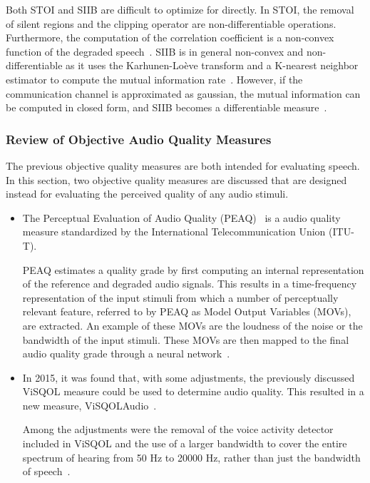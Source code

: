 Both STOI and SIIB are difficult to optimize for directly. 
In STOI, the removal of silent regions and the clipping operator are non-differentiable operations.
Furthermore, the computation of the correlation coefficient is a non-convex function of the degraded speech~\cite{taal2011algorithm}.
SIIB is in general non-convex and non-differentiable as it uses the Karhunen-Lo\`eve transform and a 
K-nearest neighbor estimator to compute the mutual information rate~\cite{van2017instrumental}.
However, if the communication channel is approximated as gaussian, the mutual information can be computed in closed form,
and SIIB becomes a differentiable measure~\cite{van2017instrumental}.

\subsubsection{Review of Objective Audio Quality Measures}
The previous objective quality measures are both intended for evaluating speech.
In this section, two objective quality measures are discussed that are designed instead 
for evaluating the perceived quality of any audio stimuli.
\begin{itemize}
    \item 
    The Perceptual Evaluation of Audio Quality (PEAQ)~\cite{thiede2000peaq}
    is a audio quality measure standardized by the International Telecommunication Union (ITU-T).

    PEAQ estimates a quality grade by first computing an internal representation  of
    the reference and degraded audio signals.
    This results in a time-frequency representation of the input stimuli from which a number of 
    perceptually relevant feature,
    referred to by PEAQ as Model Output Variables (MOVs), are extracted.
    An example of these MOVs are the loudness of the noise or the bandwidth of the input stimuli.
    These MOVs are then mapped to the final audio quality grade through a neural network~\cite{thiede2000peaq}.
    \item 
    In 2015, it was found that, with some adjustments, the previously discussed ViSQOL measure
    could be used to determine audio quality. 
    This resulted in a new measure, ViSQOLAudio~\cite{hines2015visqolaudio}.

    Among the adjustments were the removal of the voice activity detector included in ViSQOL 
    and the use of a larger bandwidth
    to cover the entire spectrum of hearing from 50 Hz to 20000 Hz, rather 
    than just the bandwidth of speech~\cite{hines2015visqolaudio}.
\end{itemize}


